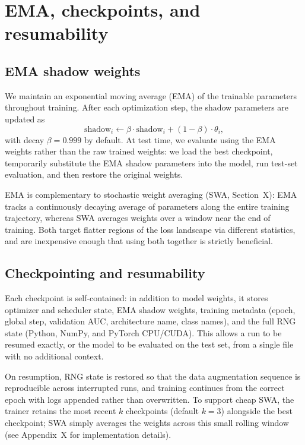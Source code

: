\documentclass[10pt,a4paper]{article}
\begin{document}
\section{EMA, checkpoints, and resumability}

\subsection{EMA shadow weights}

We maintain an exponential moving average (EMA) of the trainable
parameters throughout training. After each optimization step, the
shadow parameters are updated as
\begin{equation}
\text{shadow}_i \leftarrow \beta \cdot \text{shadow}_i + (1-\beta)\cdot \theta_i,
\end{equation}
with decay $\beta = 0.999$ by default. At test time, we evaluate using
the EMA weights rather than the raw trained weights: we load the best
checkpoint, temporarily substitute the EMA shadow parameters into the
model, run test-set evaluation, and then restore the original weights.

EMA is complementary to stochastic weight averaging (SWA, Section~X):
EMA tracks a continuously decaying average of parameters along the
entire training trajectory, whereas SWA averages weights over a
window near the end of training. Both target flatter regions of the
loss landscape via different statistics, and are inexpensive enough
that using both together is strictly beneficial.

\subsection{Checkpointing and resumability}

Each checkpoint is self-contained: in addition to model weights, it
stores optimizer and scheduler state, EMA shadow weights, training
metadata (epoch, global step, validation AUC, architecture name, class
names), and the full RNG state (Python, NumPy, and PyTorch CPU/CUDA).
This allows a run to be resumed exactly, or the model to be evaluated
on the test set, from a single file with no additional context.

On resumption, RNG state is restored so that the data augmentation
sequence is reproducible across interrupted runs, and training
continues from the correct epoch with logs appended rather than
overwritten. To support cheap SWA, the trainer retains the most recent
$k$ checkpoints (default $k=3$) alongside the best checkpoint; SWA
simply averages the weights across this small rolling window
(see Appendix~X for implementation details).
\end{document}
